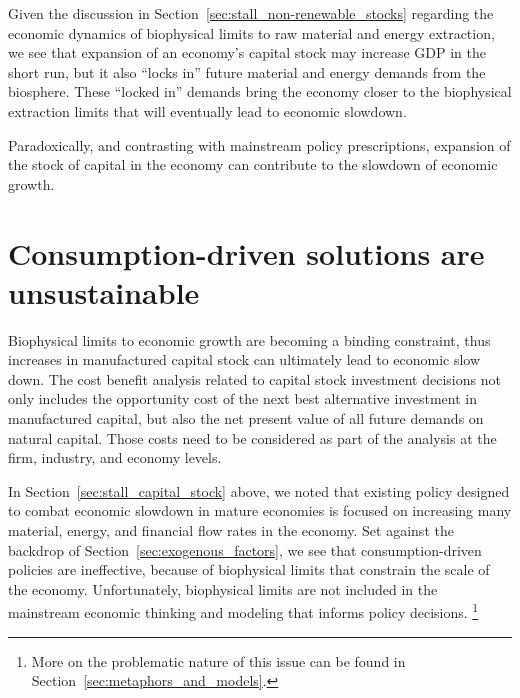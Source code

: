 Given the discussion in Section~\ref{sec:stall_non-renewable_stocks}
regarding the economic dynamics 
of biophysical limits to raw material and energy extraction,
we see that expansion of an economy's capital stock may increase GDP
in the short run, 
but it also ``locks in'' 
future material and energy demands 
from the biosphere.
These ``locked in'' demands bring the economy closer 
to the biophysical extraction limits 
that will eventually lead to economic slowdown.

\begin{svgraybox}
	Paradoxically, and contrasting with mainstream policy prescriptions,
	expansion of the stock of capital in the economy 
	can contribute to the slowdown of economic growth.
\end{svgraybox}



\section{Consumption-driven solutions are unsustainable}
\label{sec:consumption_unsustainable}

Biophysical limits to economic growth are becoming a binding constraint, 
thus increases in manufactured capital stock
can ultimately lead to economic slow down. 
The cost benefit analysis
related to capital stock investment decisions not only 
includes the opportunity cost of the next best alternative investment in manufactured capital, 
but also the net present value of all future demands on natural capital. 
Those costs need to be considered as part of the analysis 
at the firm, industry, and economy levels.

In Section~\ref{sec:stall_capital_stock} above, 
we noted that existing policy designed to combat economic slowdown 
in mature economies is focused on 
increasing many material, energy, and financial flow rates in the economy.
Set against the backdrop of Section~\ref{sec:exogenous_factors},
we see that consumption-driven policies are ineffective,
because of biophysical limits that constrain the scale of the economy. 
Unfortunately, biophysical limits 
are not included in the mainstream economic thinking and modeling
that informs policy decisions.%
	\footnote{
	More on the problematic nature of this issue
	can be found in Section~\ref{sec:metaphors_and_models}.
	}

